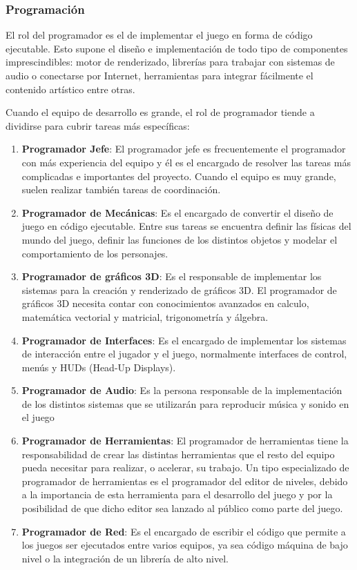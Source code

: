 \subsubsection{Programación}
El rol del programador es el de implementar el juego en forma de código ejecutable. Esto supone el diseño e implementación de todo tipo de componentes imprescindibles: motor de renderizado, librerías para trabajar con sistemas de audio o conectarse por Internet, herramientas para integrar fácilmente el contenido artístico entre otras.

Cuando el equipo de desarrollo es grande, el rol de programador tiende a dividirse para cubrir tareas más específicas\cite{development_and_production}:
\begin{enumerate}
\item \textbf{Programador Jefe}: El programador jefe es frecuentemente el programador con más experiencia del equipo y él es el encargado de resolver las tareas más complicadas e importantes del proyecto. Cuando el equipo es muy grande, suelen realizar también tareas de coordinación.
\item \textbf{Programador de Mecánicas}: Es el encargado de convertir el diseño de juego en código ejecutable. Entre sus tareas se encuentra definir las físicas del mundo del juego, definir las funciones de los distintos objetos y modelar el comportamiento de los personajes.
\item \textbf{Programador de gráficos 3D}: Es el responsable de implementar los sistemas para la creación y renderizado de gráficos 3D. El programador de gráficos 3D necesita contar con conocimientos avanzados en calculo, matemática vectorial y matricial, trigonometría y álgebra.
\item \textbf{Programador de Interfaces}: Es el encargado de implementar los sistemas de interacción entre el jugador y el juego, normalmente interfaces de control, menús y HUDs (Head-Up Displays). 
\item \textbf{Programador de Audio}: Es la persona responsable de la implementación de los distintos sistemas que se utilizarán para reproducir música y sonido en el juego
\item \textbf{Programador de Herramientas}: El programador de herramientas tiene la responsabilidad de crear las distintas herramientas que el resto del equipo pueda necesitar para realizar, o acelerar, su trabajo. Un tipo especializado de programador de herramientas es el programador del editor de niveles, debido a la importancia de esta herramienta para el desarrollo del juego y por la posibilidad de que dicho editor sea lanzado al público como parte del juego.
\item \textbf{Programador de Red}: Es el encargado de escribir el código que permite a los juegos ser ejecutados entre varios equipos, ya sea código máquina de bajo nivel o la integración de un librería de alto nivel.
\end{enumerate}
